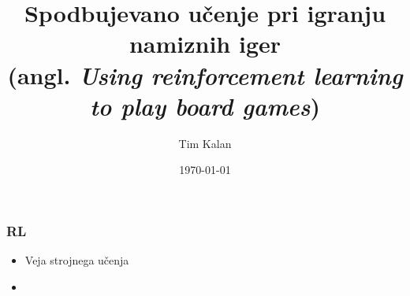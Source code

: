 \documentclass[14pt]{beamer}
\author{Tim Kalan}
\institute[FMF]{Fakulteta za matematiko in fiziko}
\title{
    Spodbujevano učenje pri igranju namiznih iger \\ 
    \large (angl. \textit{Using reinforcement learning to play board games})}
\date{\today}
\begin{document}
\begin{frame}
    \titlepage
\end{frame}

\begin{frame}
    \frametitle{RL}
    \begin{itemize}
        \item Veja strojnega učenja
        \item 
    \end{itemize}
\end{frame}
\end{document}
